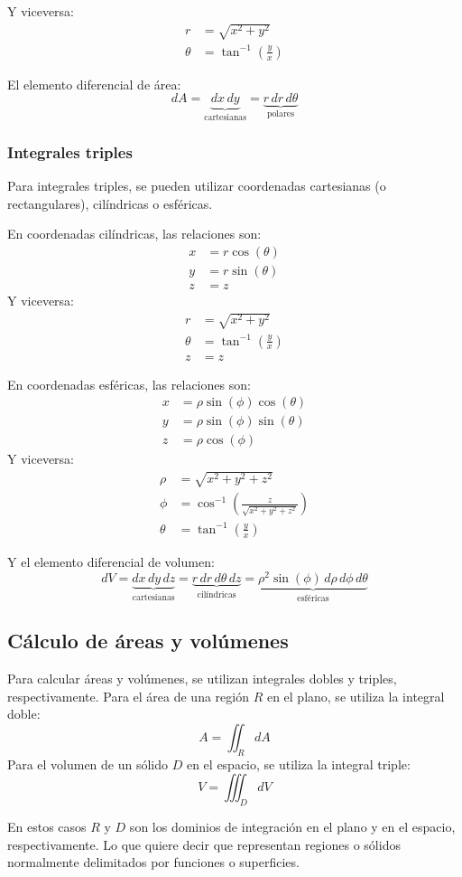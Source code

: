 Y viceversa:
\begin{align*}
r &= \sqrt{x^2 + y^2} \\
\theta &= \tan^{-1}\left(\frac{y}{x}\right)
\end{align*}

El elemento diferencial de área:
\[
dA = \underbrace{dx \, dy}_{\text{cartesianas}} = \underbrace{r \, dr \, d\theta}_{\text{polares}}
\]

\subsubsection{Integrales triples}
Para integrales triples, se pueden utilizar coordenadas cartesianas (o rectangulares), cilíndricas o esféricas.

En coordenadas cilíndricas, las relaciones son:
\begin{align*}
x &= r \cos(\theta) \\
y &= r \sin(\theta) \\
z &= z
\end{align*}
Y viceversa:
\begin{align*}
r &= \sqrt{x^2 + y^2} \\
\theta &= \tan^{-1}\left(\frac{y}{x}\right) \\
z &= z
\end{align*}

En coordenadas esféricas, las relaciones son:
\begin{align*}
x &= \rho \sin(\phi) \cos(\theta) \\
y &= \rho \sin(\phi) \sin(\theta) \\
z &= \rho \cos(\phi)
\end{align*}
Y viceversa:
\begin{align*}
\rho &= \sqrt{x^2 + y^2 + z^2} \\
\phi &= \cos^{-1}\left(\frac{z}{\sqrt{x^2 + y^2 + z^2}}\right) \\
\theta &= \tan^{-1}\left(\frac{y}{x}\right)
\end{align*}

Y el elemento diferencial de volumen:
\[
dV = \underbrace{dx \, dy \, dz}_{\text{cartesianas}} = \underbrace{r \, dr \, d\theta \, dz}_{\text{cilíndricas}} = \underbrace{\rho^2 \sin(\phi) \, d\rho \, d\phi \, d\theta}_{\text{esféricas}}
\]

\subsection{Cálculo de áreas y volúmenes}
Para calcular áreas y volúmenes, se utilizan integrales dobles y triples, respectivamente.
Para el área de una región \(R\) en el plano, se utiliza la integral doble:
\[
A = \iint_R dA
\]
Para el volumen de un sólido \(D\) en el espacio, se utiliza la integral triple:
\[
V = \iiint_D dV
\]

En estos casos \(R\) y \(D\) son los dominios de integración en el plano y en el espacio, respectivamente.
Lo que quiere decir que representan regiones o sólidos normalmente delimitados por funciones o superficies.
